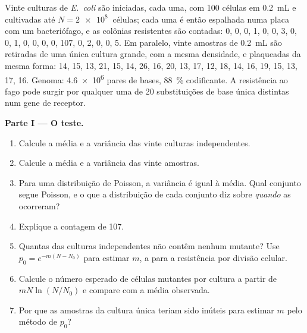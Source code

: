 \begin{problem}
\label{pb:b2:genome-diversification:1}
Vinte culturas de \emph{E.~coli} são iniciadas, cada uma, com \num{100}
células em \qty{0.2}{mL} e cultivadas até $N = \qty{2e8}{}$ células;
cada uma é então espalhada numa placa com um bacteriófago, e as
colônias resistentes são contadas: 0, 0, 0, 1, 0, 0, 3, 0, 0, 1, 0, 0,
0, 0, 107, 0, 2, 0, 0, 5. Em paralelo, vinte amostras de
\qty{0.2}{mL} são retiradas de uma única cultura grande, com a mesma
densidade, e plaqueadas da mesma forma:
14, 15, 13, 21, 15, 14, 26, 16, 20, 13, 17, 12, 18, 14, 16, 19, 15,
13, 17, 16. Genoma: \qty{4.6e6}{} pares de bases, \qty{88}{\%}
codificante. A resistência ao fago pode surgir por qualquer uma de
\num{20} substituições de base única distintas num gene de receptor.

\medskip
\noindent\textbf{Parte I --- O teste.}
\begin{enumerate}
  \item Calcule a média e a variância das vinte culturas
        independentes.
  \item Calcule a média e a variância das vinte amostras.
  \item Para uma distribuição de Poisson, a variância é igual à média.
        Qual conjunto segue Poisson, e o que a distribuição de cada
        conjunto diz sobre \emph{quando} as  ocorreram?
  \item Explique a contagem de 107.
  \item Quantas das culturas independentes não contêm nenhum mutante?
        Use $p_0 = e^{-m(N - N_0)}$ para estimar $m$, a 
        para a resistência por divisão celular.
  \item Calcule o número esperado de células mutantes por cultura a
        partir de $mN\ln(N/N_0)$ e compare com a média observada.
  \item Por que as amostras da cultura única teriam sido inúteis para
        estimar $m$ pelo método de $p_0$?
\end{enumerate}


\end{problem}
